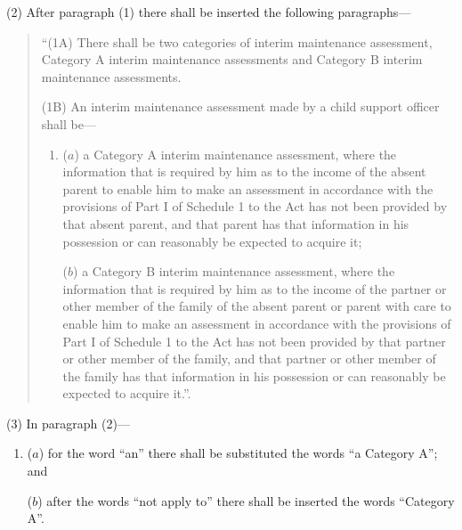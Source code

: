 \documentclass[a4paper]{article}
\begin{document}
(2) After paragraph (1) there shall be inserted the following paragraphs---
\begin{quotation}
“(1A) There shall be two categories of interim maintenance assessment, Category A interim maintenance assessments and Category B interim maintenance assessments. 

(1B) An interim maintenance assessment made by a child support officer shall be---
\begin{enumerate}\item[]
($a$) a Category A interim maintenance assessment, where the information that is required by him as to the income of the absent parent to enable him to make an assessment in accordance with the provisions of Part I of Schedule 1 to the Act has not been provided by that absent parent, and that parent has that information in his possession or can reasonably be expected to acquire it;

($b$) a Category B interim maintenance assessment, where the information that is required by him as to the income of the partner or other member of the family of the absent parent or parent with care to enable him to make an assessment in accordance with the provisions of Part I of Schedule 1 to the Act has not been provided by that partner or other member of the family, and that partner or other member of the family has that information in his possession or can reasonably be expected to acquire it.”.
\end{enumerate}
\end{quotation}

(3) In paragraph (2)---
\begin{enumerate}\item[]
($a$) for the word “an” there shall be substituted the words “a Category A”; and

($b$) after the words “not apply to” there shall be inserted the words “Category A”.
\end{enumerate}
\end{document}
